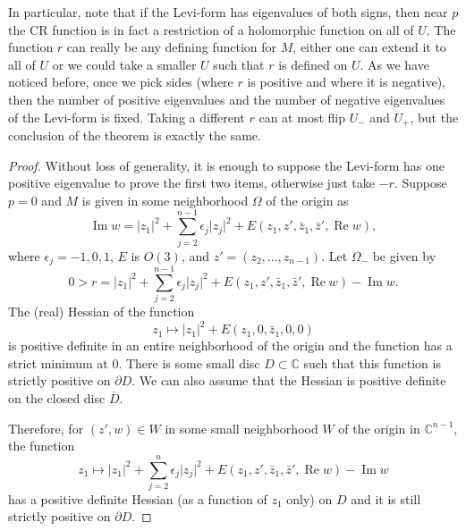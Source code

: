 \documentclass[12pt,openany]{book}
\renewcommand{\Re}{\operatorname{Re}}
\renewcommand{\Im}{\operatorname{Im}}
\newcommand{\sabs}[1]{\lvert {#1} \rvert}
\newcommand{\C}{{\mathbb{C}}}
\theoremstyle{plain}
\theoremstyle{remark}
\theoremstyle{definition}
\theoremstyle{exercise}
\theoremstyle{example}
\begin{document}
In particular, note that if the Levi-form has eigenvalues of both signs,
then near $p$ the CR function is in fact a restriction of a holomorphic
function on all of $U$.  The function $r$ can really be any defining
function for $M$, either one can extend it to all of $U$ or we could take a
smaller $U$ such that $r$ is defined on $U$.  As we have noticed before,
once we pick sides (where $r$ is positive and where it is negative), then
the number of positive eigenvalues and the number of negative eigenvalues of
the Levi-form is fixed.  Taking a different $r$ can at most flip $U_-$
and $U_+$, but the conclusion of the theorem is exactly the same.

\begin{proof}
Without loss of generality, it is enough to suppose the Levi-form has one positive eigenvalue to prove the
first two items, otherwise just take $-r$.
Suppose $p = 0$ and $M$ is given in some neighborhood
$\Omega$ of the origin as
\begin{equation*}
\Im w = \sabs{z_1}^2 + \sum_{j=2}^{n-1} \epsilon_j \sabs{z_j}^2 +
E(z_1,z',\bar{z}_1,\bar{z}',\Re w) ,
\end{equation*}
where $\epsilon_j = -1,0,1$, $E$ is $O(3)$, and $z' =
(z_2,\ldots,z_{n-1})$.  Let $\Omega_-$ be given by
\begin{equation*}
0 > r = \sabs{z_1}^2 + \sum_{j=2}^{n-1} \epsilon_j \sabs{z_j}^2 +
E(z_1,z',\bar{z}_1,\bar{z}',\Re w) - \Im w .
\end{equation*}
The (real) Hessian of the function
\begin{equation*}
z_1 \mapsto \sabs{z_1}^2 +
E(z_1,0,\bar{z}_1,0,0) 
\end{equation*}
is positive definite in an entire
neighborhood of the origin and the function has a strict minimum at 0.
There is some small disc $D \subset \C$ such
that this function is strictly positive on $\partial D$.  We can also assume
that the Hessian is positive definite on the closed disc $\overline{D}$.

Therefore,
for $(z',w) \in W$ in some small neighborhood $W$ of the origin in $\C^{n-1}$, the 
function
\begin{equation*}
z_1 \mapsto \sabs{z_1}^2 + \sum_{j=2}^n \epsilon_j \sabs{z_j}^2 +
E(z_1,z',\bar{z}_1,\bar{z}',\Re w) - \Im w
\end{equation*}
has a positive definite Hessian (as a function of $z_1$ only) on $D$ and
it is still strictly positive on $\partial D$.


\end{proof}
\end{document}

